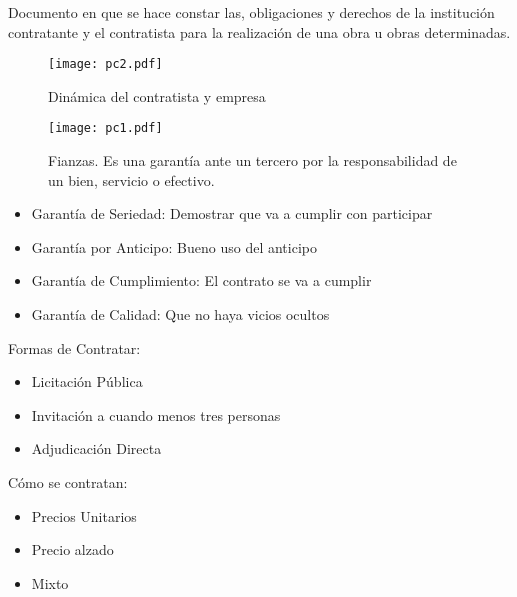 \begin{definition}[Contrato]
    Documento en que se hace constar las, obligaciones y derechos de la institución contratante y el contratista para la realización de una obra u obras determinadas.
\end{definition}
\begin{figure}[h!]
    \centering
      \texttt{[image: pc2.pdf]}
      \caption{Dinámica del contratista y empresa}
      \label{pc2}
    \end{figure}
\begin{figure}[h!]
\centering
  \texttt{[image: pc1.pdf]}
  \caption{Fianzas. Es una garantía ante un tercero por la responsabilidad de un bien, servicio o efectivo.}
  \label{pc1}
\end{figure}

\begin{itemize}
    \item Garantía de Seriedad: Demostrar que va a cumplir con participar
    \item Garantía por Anticipo: Bueno uso del anticipo
    \item Garantía de Cumplimiento: El contrato se va a cumplir
    \item Garantía de Calidad: Que no haya vicios ocultos
\end{itemize}
Formas de Contratar:
\begin{itemize}
    \item Licitación Pública
    \item Invitación a cuando menos tres personas
    \item Adjudicación Directa
\end{itemize}

Cómo se contratan:
\begin{itemize}
    \item Precios Unitarios
    \item Precio alzado
    \item Mixto
\end{itemize}

